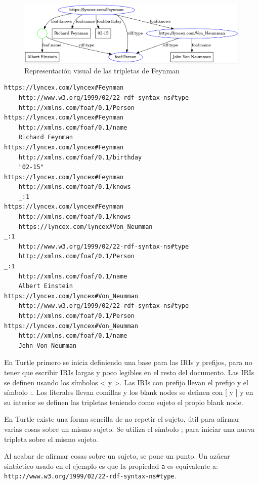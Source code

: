 \documentclass[openright,twoside,12pt]{book}
\begin{document}
\begin{figure}
    \centering
    \includegraphics[width=\textwidth]{feynman.png}
    \caption{Representación visual de las tripletas de Feynman}
    \label{fig:feynman}
\end{figure}

\begin{lstlisting}
https://lyncex.com/lyncex#Feynman
    http://www.w3.org/1999/02/22-rdf-syntax-ns#type
    http://xmlns.com/foaf/0.1/Person
https://lyncex.com/lyncex#Feynman
    http://xmlns.com/foaf/0.1/name
    Richard Feynman
https://lyncex.com/lyncex#Feynman
    http://xmlns.com/foaf/0.1/birthday
    "02-15"
https://lyncex.com/lyncex#Feynman
    http://xmlns.com/foaf/0.1/knows
    _:1
https://lyncex.com/lyncex#Feynman
    http://xmlns.com/foaf/0.1/knows
    https://lyncex.com/lyncex#Von_Neumman
_:1
    http://www.w3.org/1999/02/22-rdf-syntax-ns#type
    http://xmlns.com/foaf/0.1/Person
_:1
    http://xmlns.com/foaf/0.1/name
    Albert Einstein
https://lyncex.com/lyncex#Von_Neumman
    http://www.w3.org/1999/02/22-rdf-syntax-ns#type
    http://xmlns.com/foaf/0.1/Person
https://lyncex.com/lyncex#Von_Neumman
    http://xmlns.com/foaf/0.1/name
    John Von Neumman
\end{lstlisting}

En Turtle primero se inicia definiendo una base para las IRIs y prefijos, para no tener que escribir IRIs largas y poco legibles en el resto del documento.
Las IRIs se definen usando los símbolos < y >. Las IRIs con prefijo llevan el prefijo y el símbolo :. 
Los literales llevan comillas y los blank nodes se definen con [ y ] y en su interior se definen las tripletas teniendo como sujeto el propio blank node.

En Turtle existe una forma sencilla de no repetir el sujeto, útil para afirmar varias cosas sobre un mismo sujeto. Se utiliza el símbolo ; para iniciar una nueva tripleta sobre el mismo sujeto.

Al acabar de afirmar cosas sobre un sujeto, se pone un punto. Un azúcar sintáctico usado en el ejemplo es que la propiedad \verb|a| es equivalente a: \\
\texttt{http://www.w3.org/1999/02/22-rdf-syntax-ns\#type}.
\end{document}
